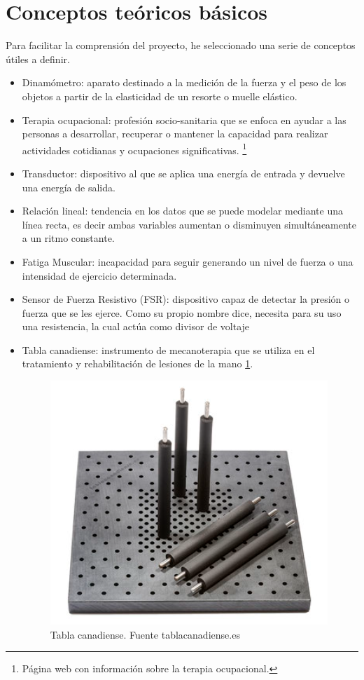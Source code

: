 \section{Conceptos teóricos básicos}
Para facilitar la comprensión del proyecto, he seleccionado una serie de conceptos útiles a definir. 
\begin{itemize}
    \item Dinamómetro: aparato destinado a la medición de la fuerza y el peso de los objetos a partir de la elasticidad de un resorte o muelle elástico.\cite{Dinamometro}
    \item Terapia ocupacional: profesión socio-sanitaria que se enfoca en ayudar a las personas a desarrollar, recuperar o mantener la capacidad para realizar actividades cotidianas y ocupaciones significativas. \cite{T.O}\footnote{Página web con información sobre la terapia ocupacional\cite{T.O}.}
    \item Transductor: dispositivo al que se aplica una energía de entrada y devuelve una energía de salida. \cite{celulas_extensométricas}
    \item Relación lineal: tendencia en los datos que se puede modelar mediante una línea recta, es decir ambas variables aumentan o disminuyen simultáneamente a un ritmo constante. \cite{Relación_lineal}
    \item Fatiga Muscular: incapacidad para seguir generando un nivel de fuerza o una intensidad de ejercicio determinada. \cite{gomez_campos_mecanismos_2010}
    \item Sensor de Fuerza Resistivo (FSR): dispositivo capaz de detectar la presión o fuerza que se les ejerce. Como su propio nombre dice, necesita para su uso una resistencia, la cual actúa como divisor de voltaje
    \item Tabla canadiense: instrumento de mecanoterapia que se utiliza en el tratamiento y rehabilitación de lesiones de la mano \ref{fig:tabla canadiense}\cite{cantero_tellez_terapia_2020}.
    \begin{figure}
        \centering
        \includegraphics[width=0.5\linewidth]{img/Tabla_Canadiense.png}
        \caption{Tabla canadiense. Fuente tablacanadiense.es}
        \label{fig:tabla canadiense}
    \end{figure}
\end{itemize}
